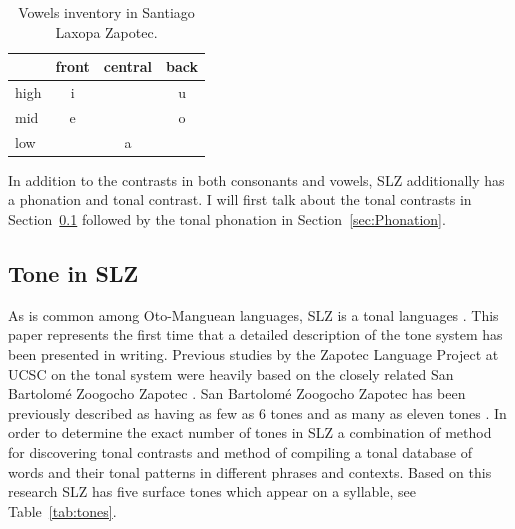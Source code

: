 \documentclass[12pt, letterpaper]{article}
\providecommand{\lsptoprule}{\midrule\toprule}
\providecommand{\lspbottomrule}{\bottomrule\midrule}
\begin{document}
	\begin{table}[!h]
		\centering
		\caption{Vowels inventory in Santiago Laxopa Zapotec.}
		\label{tab:SLZvowels}
		 \begin{tabular}{lccc}
		  \lsptoprule
					&  front& central  & back \\
		  \midrule
			high   	&  i  &     &   u \\
			mid    	&  e  &   	& 	o \\
			low   	&     &  a 	&	  \\
		  \lspbottomrule
		 \end{tabular}
		\end{table}
		
In addition to the contrasts in both consonants and vowels, SLZ additionally has a phonation and tonal contrast. I will first talk about the tonal contrasts in Section~\ref{sec:Tone} followed by the tonal phonation in Section~\ref{sec:Phonation}.

\subsection{Tone in SLZ} \label{sec:Tone}

As is common among Oto-Manguean languages, SLZ is a tonal languages \citep{suarezMesoamericanIndianLanguages1983,campbellMesoAmericaLinguisticArea1986,silvermanLaryngealComplexityOtomanguean1997,campbellOtomangueanHistoricalLinguistics2017a,campbellOtomangueanHistoricalLinguistics2017}. 
This paper represents the first time that a detailed description of the tone system has been presented in writing. Previous studies by the Zapotec Language Project at UCSC on the tonal system were heavily based on the closely related San Bartolomé Zoogocho Zapotec \citep{longDiccionarioZapotecoSan2005,sonnenscheinDescriptiveGrammarSan2005}. 
San Bartolomé Zoogocho Zapotec has been previously described as having as few as 6 tones \citep{sonnenscheinDescriptiveGrammarSan2005} and as many as eleven tones \citep{longDiccionarioZapotecoSan2005}. 
In order to determine the exact number of tones in SLZ a combination of  method for discovering tonal contrasts and  method of compiling a tonal database of words and their tonal patterns in different phrases and contexts. Based on this research SLZ has five surface tones which appear on a syllable, see Table~\ref{tab:tones}. 
\end{document}
